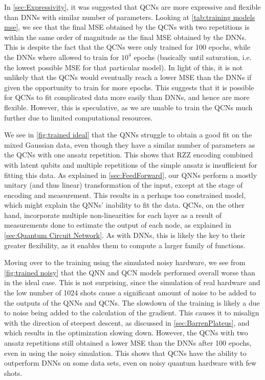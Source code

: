 In \cref{sec:Expressivity}, it was suggested that QCNs are more expressive and flexible than DNNs with similar number of parameters. Looking at \cref{tab:training models mse}, we see that the final MSE obtained by the QCNs with two repetitions is within the same order of magnitude as the final MSE obtained by the DNNs. This is despite the fact that the QCNs were only trained for 100 epochs, while the DNNs where allowed to train for $10^4$ epochs (basically until saturation, i.e. the lowest possible MSE for that particular model). In light of this, it is not unlikely that the QCNs would eventually reach a lower MSE than the DNNs if given the opportunity to train for more epochs. This suggests that it is possible for QCNs to fit complicated data more easily than DNNs, and hence are more flexible. However, this is speculative, as we are unable to train the QCNs much further due to limited computational resources.    

We see in \cref{fig:trained ideal} that the QNNs struggle to obtain a good fit on the mixed Gaussian data, even though they have a similar number of parameters as the QCNs with one ansatz repetition. This shows that RZZ encoding combined with latent qubits and multiple repetitions of the simple ansatz is insufficient for fitting this data. As explained in \cref{sec:FeedForward}, our QNNs perform a mostly unitary (and thus linear) transformation of the input, except at the stage of encoding and measurement. This results in a perhaps too constrained model, which might explain the QNNs' inability to fit the data. QCNs, on the other hand, incorporate multiple non-linearities for each layer as a result of measurements done to estimate the output of each node, as explained in \cref{sec:Quantum Circuit Network}. As with DNNs, this is likely the key to their greater flexibility, as it enables them to compute a larger family of functions. 

Moving over to the training using the simulated noisy hardware, we see from \cref{fig:trained noisy} that the QNN and QCN models performed overall worse than in the ideal case. This is not surprising, since the simulation of real hardware and the low number of 1024 shots cause a significant amount of noise to be added to the outputs of the QNNs and QCNs. The slowdown of the training is likely a due to noise being added to the calculation of the gradient. This causes it to misalign with the direction of steepest descent, as discussed in \cref{sec:BarrenPlateus}, and which results in the optimization slowing down. However, the QCNs with two ansatz repetitions still obtained a lower MSE than the DNNs after 100 epochs, even in using the noisy simulation. This shows that QCNs have the ability to outperform DNNs on some data sets, even on noisy quantum hardware with few shots. 


